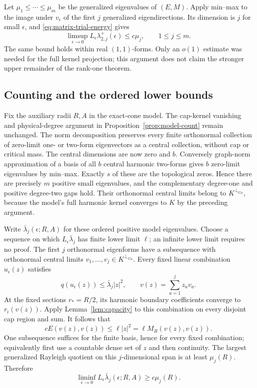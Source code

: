Let $\mu_1\le\cdots\le\mu_m$ be the generalized eigenvalues of
$(E,M)$. Apply min--max to the image under $v_\epsilon$ of the first
$j$ generalized eigendirections. Its dimension is $j$ for small
$\epsilon$, and \eqref{eq:matrix-trial-energy} gives
\begin{equation}\label{eq:matrix-upper}
 \limsup_{\epsilon\to0}L_\epsilon\lambda_{2,j}^+(\epsilon)
 \le c\mu_j,\qquad 1\le j\le m.
\end{equation}
The same bound holds within real $(1,1)$-forms. Only an $o(1)$ estimate
was needed for the full kernel projection; this argument does not claim
the stronger upper remainder of the rank-one theorem.

\subsection{Counting and the ordered lower bounds}
Fix the auxiliary radii $R,A$ in the exact-cone model. The cap-kernel
vanishing and physical-degree argument in
Proposition~\ref{prop:model-count} remain unchanged. The norm
decomposition preserves every finite orthonormal collection of
zero-limit one- or two-form eigenvectors as a central collection,
without cap or critical mass. The central dimensions are now zero
and $b$. Conversely graph-norm approximation of a basis of all $b$
central harmonic two-forms gives $b$ zero-limit eigenvalues by
min--max. Exactly $s$ of these are the topological zeros. Hence there
are precisely $m$ positive small eigenvalues, and the complementary
degree-one and positive degree-two gaps hold. Their orthonormal central
limits belong to $K^{\perp_{G_R}}$, because the model's full harmonic
kernel converges to $K$ by the preceding argument.

Write $\bar\lambda_j(\epsilon;R,A)$ for these ordered positive
model eigenvalues. Choose a sequence on which
$L_\epsilon\bar\lambda_j$ has finite lower limit $\ell$; an
infinite lower limit requires no proof. The first $j$ orthonormal
eigenforms have a subsequence with orthonormal central limits
$v_1,\ldots,v_j\in K^{\perp_{G_R}}$. Every fixed linear combination
$u_\epsilon(z)$ satisfies
\[
 q(u_\epsilon(z))\le\bar\lambda_j|z|^2,
 \qquad v(z)=\sum_{a=1}^jz_av_a.
\]
At the fixed sections $r_*=R/2$, its harmonic boundary coefficients
converge to $r_i(v(z))$. Apply Lemma~\ref{lem:capacity} to this
combination on every disjoint cap region and sum. It follows that
\[
 cE(v(z),v(z))\le\ell |z|^2
                  =\ell M_R(v(z),v(z)).
\]
One subsequence suffices for the finite basis, hence for every fixed
combination; equivalently first use a countable dense set of $z$ and
then continuity. The largest generalized Rayleigh quotient on this
$j$-dimensional span is at least $\mu_j(R)$. Therefore
\begin{equation}\label{eq:matrix-model-lower}
 \liminf_{\epsilon\to0}L_\epsilon\bar\lambda_j(\epsilon;R,A)
 \ge c\mu_j(R).
\end{equation}

